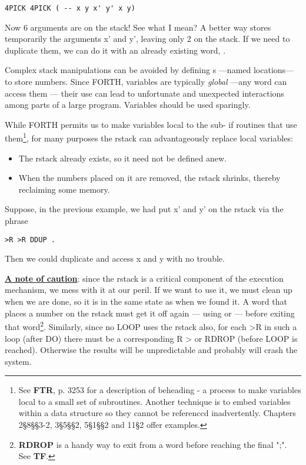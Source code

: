 \begin{lstlisting}
4PICK 4PICK ( -- x y x' y' x y)
\end{lstlisting}

Now 6 arguments are on the stack! See what I mean? A better way stores temporarily the arguments x’ and y', leaving only 2 on the stack. If we need to duplicate them, we can do it with an already existing word, .

Complex stack manipulations can be avoided by defining s —named locations— to store numbers. Since FORTH, variables are typically \textit{global} —any word can access them — their use can lead to unfortunate and unexpected interactions among parts of a large program. Variables should be used sparingly.

While FORTH permits us to make variables local to the sub- if routines that use them\footnote{See \textbf{FTR}, p. 3253 for a description of beheading - a process to make variables local to a small set of subroutines. Another technique is to embed variables within a data structure so they cannot be referenccd inadvertently. Chapters 2§8§§3-2, 3§5§§2, 5§1§§2 and 11§2 offer examples.}, for many purposes the rstack can advantageously replace local variables:

\begin{itemize}
    \item The rstack already exists, so it need not be defined anew.
    \item When the numbers placed on it are removed, the rstack shrinks, thereby reclaiming some memory.
\end{itemize}

Suppose, in the previous example, we had put x’ and y’ on the rstack via the phrase

\begin{lstlisting}
>R >R DDUP .
\end{lstlisting}

Then we could duplicate and access x and y with no trouble.

\leftbar[1\linewidth]
\underline{\textbf{A note of caution}}: since the rstack is a critical component of the execution mechanism, we mess with it at our peril. If we want to use it, we must clean up when we are done, so it is in the same state as when we found it. A word that places a number on the rstack must get it off again — using  or  — before exiting that word\footnote{\textbf{RDROP} is a handy way to exit from a word before reaching the final ";". See \textbf{TF}.}. Similarly, since no LOOP uses the rstack also, for each >R in such a loop (after DO) there must be a corresponding R > or RDROP (before LOOP is reached). Otherwise the results will be unpredictable and probably will crash the system.
\endleftbar

